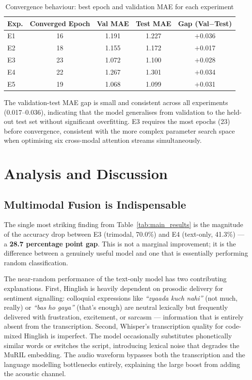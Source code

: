 \begin{table}[ht]
\centering
\caption{Convergence behaviour: best epoch and validation MAE for each experiment}
\label{tab:convergence}
\renewcommand{\arraystretch}{1.3}
\begin{tabular}{lcccc}
\toprule
\textbf{Exp.} & \textbf{Converged Epoch} & \textbf{Val MAE} & \textbf{Test MAE} & \textbf{Gap (Val$-$Test)} \\
\midrule
E1 & 16 & 1.191 & 1.227 & $+$0.036 \\
E2 & 18 & 1.155 & 1.172 & $+$0.017 \\
E3 & 23 & 1.072 & 1.100 & $+$0.028 \\
E4 & 22 & 1.267 & 1.301 & $+$0.034 \\
E5 & 19 & 1.068 & 1.099 & $+$0.031 \\
\bottomrule
\end{tabular}
\end{table}

The validation-test MAE gap is small and consistent across all experiments (0.017--0.036), indicating that the model generalises from validation to the held-out test set without significant overfitting. E3 requires the most epochs (23) before convergence, consistent with the more complex parameter search space when optimising six cross-modal attention streams simultaneously.

\section{Analysis and Discussion}

\subsection{Multimodal Fusion is Indispensable}

The single most striking finding from Table~\ref{tab:main_results} is the magnitude of the accuracy drop between E3 (trimodal, 70.0\%) and E4 (text-only, 41.3\%) --- a \textbf{28.7 percentage point gap}. This is not a marginal improvement; it is the difference between a genuinely useful model and one that is essentially performing random classification.

The near-random performance of the text-only model has two contributing explanations. First, Hinglish is heavily dependent on prosodic delivery for sentiment signalling: colloquial expressions like \textit{``zyaada kuch nahi''} (not much, really) or \textit{``bas ho gaya''} (that's enough) are neutral lexically but frequently delivered with frustration, excitement, or sarcasm --- information that is entirely absent from the transcription. Second, Whisper's transcription quality for code-mixed Hinglish is imperfect. The model occasionally substitutes phonetically similar words or switches the script, introducing lexical noise that degrades the MuRIL embedding. The audio waveform bypasses both the transcription and the language modelling bottlenecks entirely, explaining the large boost from adding the acoustic channel.

